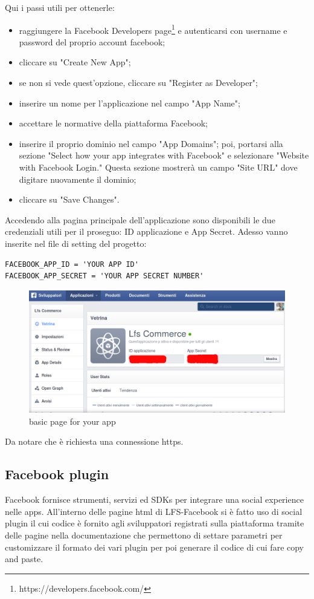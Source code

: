Qui i passi utili per ottenerle:
\begin{itemize}
	\item raggiungere la Facebook Developers page\footnote{https://developers.facebook.com/} e autenticarsi con username e password del proprio account facebook;
	\item cliccare su "Create New App";
	\item se non si vede quest'opzione, cliccare su "Register as Developer";
	\item inserire un nome per l'applicazione nel campo "App Name";
	\item accettare le normative della piattaforma Facebook;
	\item inserire il proprio dominio nel campo "App Domains"; poi, portarsi alla sezione "Select how your app integrates with Facebook" e selezionare "Website with Facebook Login." Questa sezione mostrerà un campo "Site URL" dove digitare nuovamente il dominio;
	\item cliccare su "Save Changes".
\end{itemize}
Accedendo alla pagina principale dell'applicazione sono disponibili le due credenziali utili per il proseguo: ID applicazione e App Secret.
Adesso vanno inserite nel file di setting del progetto:

\begin{lstlisting}
FACEBOOK_APP_ID = 'YOUR APP ID'
FACEBOOK_APP_SECRET = 'YOUR APP SECRET NUMBER'
\end{lstlisting}
\begin{figure}
\centering
\includegraphics[width=0.9\columnwidth]{img/app_home2}
\caption{basic page for your app}
\end{figure}
Da notare che è richiesta una connessione https.

\subsection{Facebook plugin}
Facebook fornisce strumenti, servizi ed SDKs per integrare una social experience nelle apps. All'interno delle pagine html di LFS-Facebook si è fatto uso di social plugin il cui codice è fornito agli sviluppatori registrati sulla piattaforma tramite delle pagine nella documentazione che permettono di settare parametri per customizzare il formato dei vari plugin per poi generare il codice di cui fare copy and paste.

